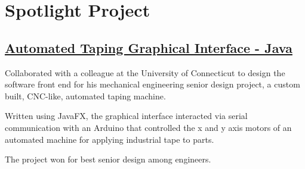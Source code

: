 \documentclass[letterpaper]{deedy-resume} %
\begin{document}
\begin{minipage}[t]{0.66\textwidth}
\section{Spotlight Project}
\subsection{\href{https://github.com/acf5118/AutomatedTapingGUI}{Automated Taping Graphical Interface - Java}}
\begin{tightitemize}
\item Collaborated with a colleague at the University of Connecticut to design the software front end for his mechanical engineering senior design project, a custom built, CNC-like, automated taping machine.
\item Written using JavaFX, the graphical interface interacted via serial communication with an Arduino that controlled the x and y axis motors of an automated machine for applying industrial tape to parts. 
\item The project won for best senior design among engineers. 
\end{tightitemize}
\sectionspace
\end{minipage}
\end{document}
